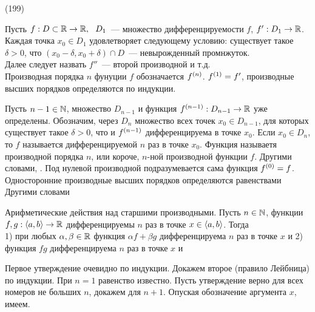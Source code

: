 (199)

Пусть $f: D \subset \mathbb{R} \to \mathbb{R},\ \  D_1$~--- множество дифференцируемости $f$, $f': D_1 \to \mathbb{R}$. Каждая точка $x_0 \in D_1$ удовлетворяет следующему условию: существует такое $\delta > 0$, что $(x_0 - \delta, x_0 + \delta) \cap D$~--- невырожденный промнжуток.\\
Далее следует назвать $f''$~--- второй производной и т.д.\\
Производная порядка $n$ фунуции $f$ обозначается $f^{(n)}$. $f^{(1)} = f'$, производные высших порядков определяются по индукции.

\Op Пусть $n - 1 \in \mathbb{N}$, множество $D_{n - 1}$ и функция $f^{(n-1)}: D_{n - 1} \to \mathbb{R}$ уже определены. Обозначим, через $D_n$ множество всех точек $x_0 \in D_{n - 1}$, для которых существует такое $\delta > 0$, что  и $f^{(n - 1)}$ дифференцируема в точке $x_0$.  Если $x_0 \in D_n$, то $f$ называется дифференцируемой $n$ раз в точке $x_0$. Функция  называетя производной порядка $n$, или короче, $n$-ной производной функции $f$. Другими словами, . Под нулевой производной подразумевается сама функция $f^{(0)} = f$. Односторонние производные высших порядков определяются равенствами  Другими словами 

\T \q Арифметические действия над старшими производными. Пусть $n \in \mathbb{N}$, функции $f, g: \langle a, b \rangle \to\mathbb{R}$ дифференцируемы $n$ раз в точке $x \in \langle a, b \rangle$. Тогда\\
1) при любых $\alpha, \beta \in \mathbb{R}$  функция $\alpha f + \beta g$ дифференцируема $n$ раз в точке $x$ и 
2) функция $fg$ дифференцируема $n$ раз в точке $x$ и 

\D Первое утверждение очевидно по индукции. Докажем второе (правило Лейбница) по индукции. При $n = 1$ равенство известно. Пусть утверждение верно для всех номеров не больших $n$, докажем для $n + 1$. Опуская обозначение аргумента $x$, имеем.

